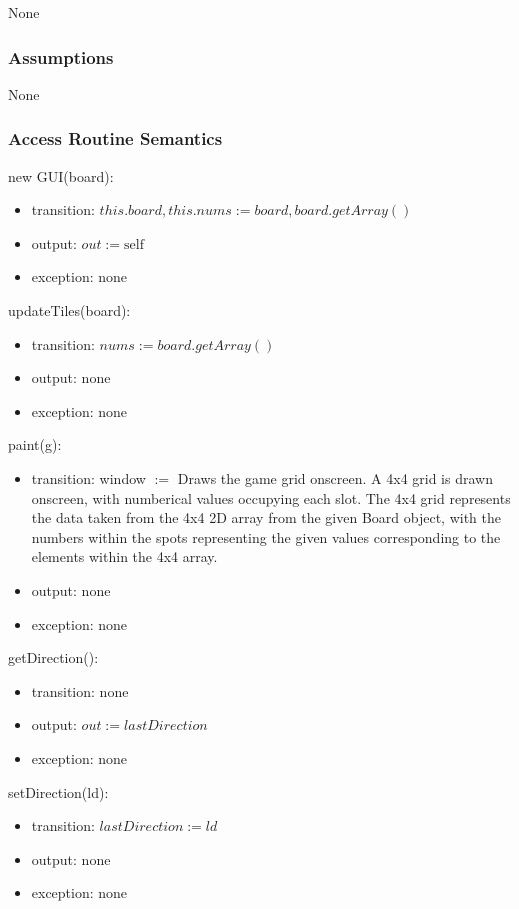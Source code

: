 \documentclass[12pt]{article}
\begin{document}
None

\subsubsection* {Assumptions}

None

\subsubsection* {Access Routine Semantics}

\noindent new GUI(board):
\begin{itemize}
\item transition: $this.board, this.nums := board, board.getArray()$
\item output: $out := \mbox{self}$
\item exception: none
\end{itemize}

\noindent updateTiles(board):
\begin{itemize}
\item transition: $nums := board.getArray()$
\item output: none
\item exception: none
\end{itemize}

\noindent paint(g):
\begin{itemize}
\item transition: window $:=$ Draws the game grid onscreen. A 4x4 grid is drawn onscreen, with numberical values occupying each slot. The 4x4 grid represents the data taken from the 4x4 2D array from the given Board object, with the numbers within the spots representing the given values corresponding to the elements within the 4x4 array. 
\item output: none
\item exception: none
\end{itemize}

\noindent getDirection():
\begin{itemize}
\item transition: none
\item output: $out := lastDirection$
\item exception: none
\end{itemize}

\noindent setDirection(ld):
\begin{itemize}
\item transition: $lastDirection := ld$
\item output: none
\item exception: none
\end{itemize}
\end{document}
